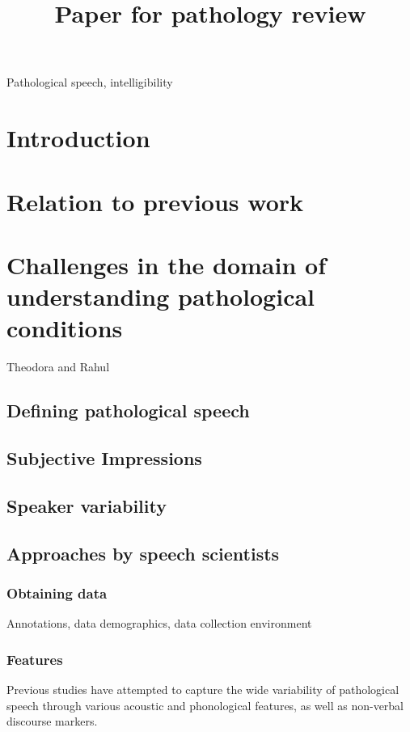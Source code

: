\documentclass{article}
\title{Paper for pathology review}
\begin{document}
\ninept
%
\maketitle
%
\begin{abstract}
 
\end{abstract}
%
\begin{keywords}
Pathological speech, intelligibility 
\end{keywords}
%
\section{Introduction}
\label{sec:intro}

\section{Relation to previous work}

\section{Challenges in the domain of understanding pathological conditions}
Theodora and Rahul
\subsection{Defining pathological speech}
\subsection{Subjective Impressions}
\subsection{Speaker variability}
\subsection{Approaches by speech scientists}

\subsubsection{Obtaining data}
Annotations, data demographics, data collection environment

\subsubsection{Features}
Previous studies have attempted to capture the wide variability of pathological speech through various acoustic and phonological features, as well as non-verbal discourse markers.
\end{document}
